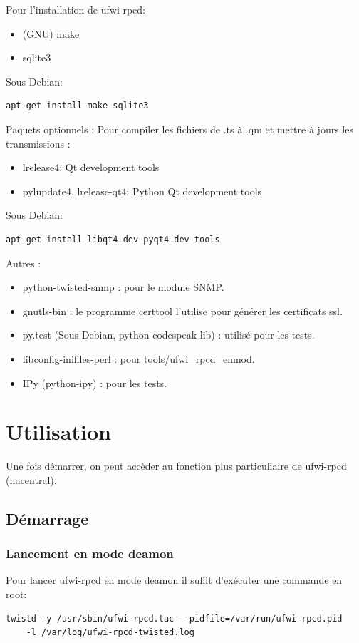 \documentclass[12pt]{report}
\begin{document}
\begin{itemize}
Pour l'installation de ufwi-rpcd:
\begin{itemize}
  \item (GNU) make
  \item sqlite3
\end{itemize}
Sous Debian: \begin{verbatim}apt-get install make sqlite3\end{verbatim}
\newline

Paquets optionnels :
Pour compiler les fichiers de .ts à .qm et mettre à jours les transmissions :
\begin{itemize}
  \item lrelease4: Qt development tools
  \item pylupdate4, lrelease-qt4: Python Qt development tools
\end{itemize}
Sous Debian: \begin{verbatim}apt-get install libqt4-dev pyqt4-dev-tools\end{verbatim}
\newline

Autres :
\begin{itemize}
  \item python-twisted-snmp : pour le module SNMP.
  \item gnutls-bin : le programme certtool l'utilise pour générer les certificats ssl.
  \item py.test (Sous Debian, python-codespeak-lib) : utilisé pour les tests.
  \item libconfig-inifiles-perl : pour tools/ufwi\_rpcd\_enmod.
  \item IPy (python-ipy) : pour les tests.
\end{itemize}

\section{Utilisation}
Une fois démarrer, on peut accèder au fonction plus particuliaire de ufwi-rpcd (nucentral).
\subsection{Démarrage}
\subsubsection{Lancement en mode deamon}
Pour lancer ufwi-rpcd en mode deamon il suffit d'exécuter une commande en root:
\begin{verbatim}
twistd -y /usr/sbin/ufwi-rpcd.tac --pidfile=/var/run/ufwi-rpcd.pid 
    -l /var/log/ufwi-rpcd-twisted.log
\end{verbatim}
   

\end{itemize}
\end{document}
